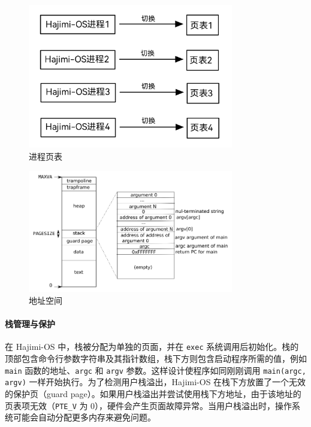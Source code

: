 \documentclass[UTF8]{article}
\begin{document}
\begin{figure}[htbp]
  \centering
  \includegraphics[width=0.8\textwidth]{mm1.png}
  \caption{进程页表}
  \label{进程页表}
\end{figure}
\begin{figure}[htbp]
  \centering
  \includegraphics[width=0.8\textwidth]{mm2.png}
  \caption{地址空间}
  \label{地址空间}
\end{figure}

\paragraph{栈管理与保护\\}
在 Hajimi-OS 中，栈被分配为单独的页面，并在 \texttt{exec} 系统调用后初始化。栈的顶部包含命令行参数字符串及其指针数组，栈下方则包含启动程序所需的值，例如 \texttt{main} 函数的地址、\texttt{argc} 和 \texttt{argv} 参数。这样设计使程序如同刚刚调用 \texttt{main(argc, argv)} 一样开始执行。为了检测用户栈溢出，Hajimi-OS 在栈下方放置了一个无效的保护页（guard page）。如果用户栈溢出并尝试使用栈下方地址，由于该地址的页表项无效（\texttt{PTE\_V} 为 0），硬件会产生页面故障异常。当用户栈溢出时，操作系统可能会自动分配更多内存来避免问题。
\end{document}
